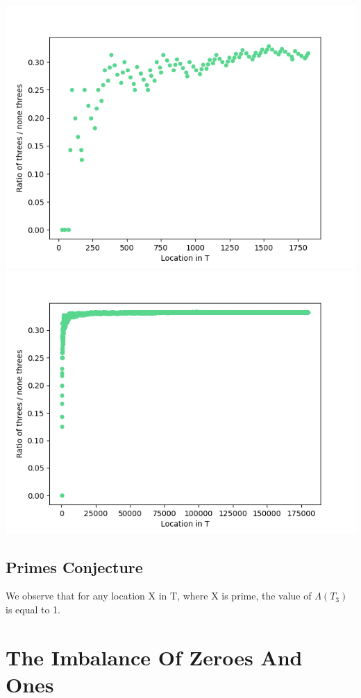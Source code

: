 \documentclass{article}
\begin{document}
\includegraphics[scale=0.4]{lambda_ratio_from_data1_ones_100}
\includegraphics[scale=0.4]{lambda_ratio_from_data1_ones_10000}

\subsection{Primes Conjecture}
We observe that for any location X in T, where X is prime, the value of $\Lambda{(T_3)}$ is equal to 1.

\section{The Imbalance Of Zeroes And Ones}
\end{document}
